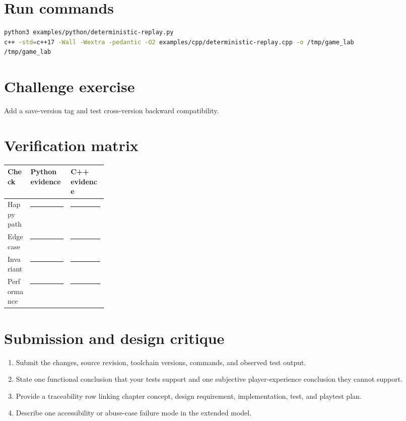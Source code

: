 \documentclass[11pt]{article}
\begin{document}
\section{Run commands}
\begin{lstlisting}[language=bash]
python3 examples/python/deterministic-replay.py
c++ -std=c++17 -Wall -Wextra -pedantic -O2 examples/cpp/deterministic-replay.cpp -o /tmp/game_lab
/tmp/game_lab
\end{lstlisting}

\section{Challenge exercise}
Add a save-version tag and test cross-version backward compatibility.


\section{Verification matrix}
\begin{tabularx}{\linewidth}{@{}p{0.23\linewidth}X X@{}}\toprule Check & Python evidence & C++ evidence\\\midrule
Happy path & \rule{0.85\linewidth}{0.4pt} & \rule{0.85\linewidth}{0.4pt}\\[0.35cm]
Edge case & \rule{0.85\linewidth}{0.4pt} & \rule{0.85\linewidth}{0.4pt}\\[0.35cm]
Invariant & \rule{0.85\linewidth}{0.4pt} & \rule{0.85\linewidth}{0.4pt}\\[0.35cm]
Performance & \rule{0.85\linewidth}{0.4pt} & \rule{0.85\linewidth}{0.4pt}\\\bottomrule\end{tabularx}

\section{Submission and design critique}
\begin{enumerate}
\item Submit the changes, source revision, toolchain versions, commands, and observed test output.
\item State one functional conclusion that your tests support and one subjective player-experience conclusion they cannot support.
\item Provide a traceability row linking chapter concept, design requirement, implementation, test, and playtest plan.
\item Describe one accessibility or abuse-case failure mode in the extended model.
\end{enumerate}
\end{document}

